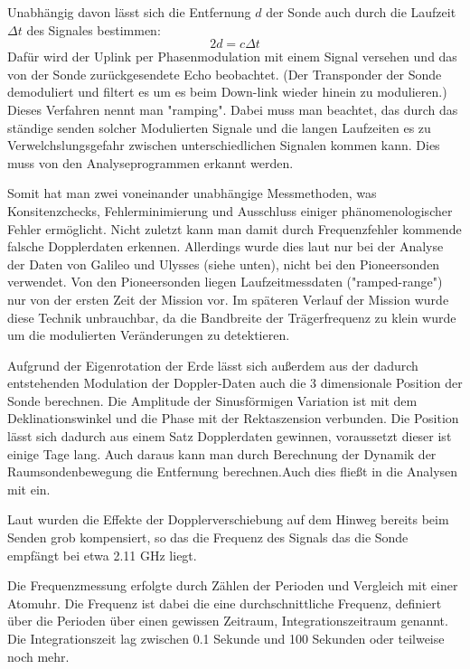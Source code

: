 Unabhängig davon lässt sich die Entfernung $d$ der Sonde auch durch die Laufzeit $\Delta t$ des Signales bestimmen:
\begin{equation}
 2d = c \Delta t
\end{equation}
Dafür wird der Uplink per Phasenmodulation mit einem Signal versehen und das von der Sonde zurückgesendete Echo beobachtet. (Der Transponder der Sonde demoduliert und filtert es um es beim Down-link wieder hinein zu modulieren.) Dieses Verfahren nennt man "ramping". %
Dabei muss man beachtet, das durch das ständige senden solcher Modulierten Signale und die langen Laufzeiten es zu Verwelchslungsgefahr zwischen unterschiedlichen Signalen kommen kann. Dies muss von den Analyseprogrammen erkannt werden.

Somit hat man zwei voneinander unabhängige Messmethoden, was Konsitenzchecks,
Fehlerminimierung und Ausschluss einiger phänomenologischer Fehler ermöglicht. Nicht zuletzt kann man damit durch Frequenzfehler kommende falsche Dopplerdaten erkennen.\cite{Anderson2002}
Allerdings wurde dies laut \cite{Anderson2002} nur bei der Analyse der Daten von Galileo und Ulysses (siehe unten), nicht bei den Pioneersonden verwendet. Von den Pioneersonden liegen Laufzeitmessdaten ("ramped-range") nur von der ersten Zeit der Mission vor. Im späteren Verlauf der Mission wurde diese Technik unbrauchbar, da die Bandbreite der Trägerfrequenz zu klein wurde um die modulierten Veränderungen zu detektieren.\cite{Turyshev2010} %

Aufgrund der Eigenrotation der Erde lässt sich außerdem aus der dadurch entstehenden Modulation der Doppler-Daten auch die 3 dimensionale Position der Sonde berechnen. Die Amplitude der Sinusförmigen Variation ist mit dem Deklinationswinkel und die Phase mit der Rektaszension verbunden. Die Position lässt sich dadurch aus einem Satz Dopplerdaten gewinnen, voraussetzt dieser ist einige Tage lang. Auch daraus kann man durch Berechnung der Dynamik der Raumsondenbewegung die Entfernung berechnen.Auch dies fließt in die Analysen mit ein.\cite{Anderson2002} %

Laut \cite{Markwardt2002} wurden die Effekte der Dopplerverschiebung auf dem Hinweg bereits beim Senden grob kompensiert, so das die Frequenz des Signals das die Sonde empfängt bei etwa 2.11 GHz liegt.

Die Frequenzmessung erfolgte durch Zählen der Perioden und Vergleich mit einer Atomuhr.\cite{Nieto2007} %
Die Frequenz ist dabei die eine durchschnittliche Frequenz, definiert über die Perioden über einen gewissen Zeitraum, Integrationszeitraum genannt. Die Integrationszeit lag zwischen 0.1 Sekunde und 100 Sekunden oder teilweise noch mehr.\cite{Markwardt2002}

